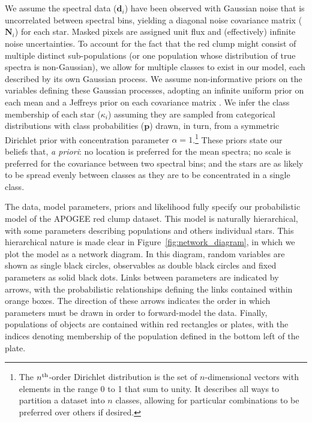 \documentclass[a4paper,fleqn,usenatbib]{mnras}
\newcommand{\classprobs}{{\bm p}}
\newcommand{\objclass}{{\kappa}}
\newcommand{\objdata}{\hat{\bm d}}
\newcommand{\objnoise}{{\bm N}}
\begin{document}
We assume the spectral data ($\objdata_i$) have been observed with Gaussian noise that is uncorrelated between spectral bins, yielding a diagonal noise covariance matrix ($\objnoise_i$) for each star. Masked pixels are assigned unit flux and (effectively) infinite noise uncertainties. To account for the fact that the red clump might consist of multiple distinct sub-populations (or one population whose distribution of true spectra is non-Gaussian), we allow for multiple classes to exist in our model, each described by its own Gaussian process. We assume non-informative priors on the variables defining these Gaussian processes, adopting an infinite uniform prior on each mean and a Jeffreys prior on each covariance matrix \citep[p73]{Gelman_etal:2013}. We infer the class membership of each star ($\objclass_i$) assuming they are sampled from categorical distributions with class probabilities ($\classprobs$) drawn, in turn, from a symmetric Dirichlet prior with concentration parameter $\alpha=1$.\footnote{The $n^{\rm th}$-order Dirichlet distribution is the set of $n$-dimensional vectors with elements in the range 0 to 1 that sum to unity. It describes all ways to partition a dataset into $n$ classes, allowing for particular combinations to be preferred over others if desired.} These priors state our beliefs that, {\it a priori}: no location is preferred for the mean spectra; no scale is preferred for the covariance between two spectral bins; and the stars are as likely to be spread evenly between classes as they are to be concentrated in a single class.

The data, model parameters, priors and likelihood fully specify our probabilistic model of the APOGEE red clump dataset. This model is naturally hierarchical, with some parameters describing populations and others individual stars. This hierarchical nature is made clear in Figure~\ref{fig:network_diagram}, in which we plot the model as a network diagram. In this diagram, random variables are shown as single black circles, observables as double black circles and fixed parameters as solid black dots. Links between parameters are indicated by arrows, with the probabilistic relationships defining the links contained within orange boxes. The direction of these arrows indicates the order in which parameters must be drawn in order to forward-model the data. Finally, populations of objects are contained within red rectangles or plates, with the indices denoting membership of the population defined in the bottom left of the plate.
\end{document}

